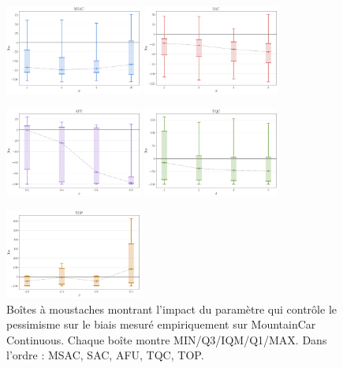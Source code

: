 \documentclass[a4paper, 12pt]{report}
\begin{document}
    \begin{figure}[htbp]
        \centering
        \includegraphics[width=0.4\textwidth]{../figures/env_param_msac.png}
        \quad
        \includegraphics[width=0.4\textwidth]{../figures/env_param_sac.png}

        \vspace{0.5cm}

        \includegraphics[width=0.4\textwidth]{../figures/env_param_afu.png}
        \quad
        \includegraphics[width=0.4\textwidth]{../figures/env_param_tqc.png}
        
        \vspace{0.5cm}

        \includegraphics[width=0.4\textwidth]{../figures/env_param_top.png}
        
        \caption{Boîtes à moustaches montrant l'impact du paramètre qui contrôle le pessimisme sur le biais mesuré empiriquement sur MountainCar Continuous. Chaque boîte montre MIN/Q3/IQM/Q1/MAX. Dans l'ordre : MSAC, SAC, AFU, TQC, TOP.}
        \label{fig:bias-measurements}
    \end{figure}
\end{document}
